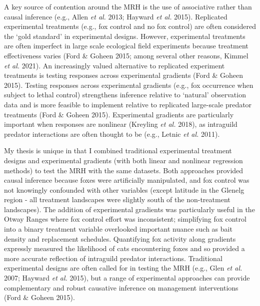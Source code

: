 \documentclass[11pt,a4paper,titlepage,twoside,openright]{style/unimelbthesis}
\begin{document}
\begin{mainmatter}
A key source of contention around the MRH is the use of associative rather than causal inference (e.g., Allen \emph{et al.} 2013; Hayward \emph{et al.} 2015). Replicated experimental treatments (e.g., fox control and no fox control) are often considered the `gold standard' in experimental designs. However, experimental treatments are often imperfect in large scale ecological field experiments because treatment effectiveness varies (Ford \& Goheen 2015; among several other reasons, Kimmel \emph{et al.} 2021). An increasingly valued alternative to replicated experiment treatments is testing responses across experimental gradients (Ford \& Goheen 2015). Testing responses across experimental gradients (e.g., fox occurrence when subject to lethal control) strengthens inference relative to `natural' observation data and is more feasible to implement relative to replicated large-scale predator treatments (Ford \& Goheen 2015). Experimental gradients are particularly important when responses are nonlinear (Kreyling \emph{et al.} 2018), as intraguild predator interactions are often thought to be (e.g., Letnic \emph{et al.} 2011).

My thesis is unique in that I combined traditional experimental treatment designs and experimental gradients (with both linear and nonlinear regression methods) to test the MRH with the same datasets. Both approaches provided causal inference because foxes were artificially manipulated, and fox control was not knowingly confounded with other variables (except latitude in the Glenelg region - all treatment landscapes were slightly south of the non-treatment landscapes). The addition of experimental gradients was particularly useful in the Otway Ranges where fox control effort was inconsistent; simplifying fox control into a binary treatment variable overlooked important nuance such as bait density and replacement schedules. Quantifying fox activity along gradients expressly measured the likelihood of cats encountering foxes and so provided a more accurate reflection of intraguild predator interactions. Traditional experimental designs are often called for in testing the MRH (e.g., Glen \emph{et al.} 2007; Hayward \emph{et al.} 2015), but a range of experimental approaches can provide complementary and robust causative inference on management interventions (Ford \& Goheen 2015).


\end{mainmatter}
\end{document}
